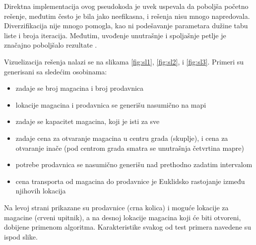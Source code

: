 \documentclass[a4paper]{article}
\begin{document}
Direktna implementacija ovog pseudokoda je uvek uspevala da poboljša početno rešenje, međutim često je bila jako neefikasna, i rešenja nisu mnogo napredovala. Diverzifikacija nije mnogo pomogla, kao ni podešavanje parametara dužine tabu liste i broja iteracija. Međutim, uvođenje unutrašnje i spoljašnje petlje je značajno poboljšalo rezultate \cite{loops}. 

Vizuelizacija rešenja nalazi se na slikama \ref{fig:sl1}, \ref{fig:sl2}, i \ref{fig:sl3}. Primeri su generisani sa sledećim osobinama:
\begin{itemize}
    \item zadaje se broj magacina i broj prodavnica
    \item lokacije magacina i prodavnica se generišu nasumično na mapi
    \item zadaje se kapacitet magacina, koji je isti za sve
    \item zadaje cena za otvaranje magacina u centru grada (skuplje), i cena za otvaranje inače (pod centrom grada smatra se unutrašnja četvrtina mapre)
    \item potrebe prodavnica se nasumično generišu nad prethodno zadatim intervalom
    \item cena transporta od magacina do prodavnice je Euklidsko rastojanje između njihovih lokacija
\end{itemize}

Na levoj strani prikazane su prodavnice (crna kolica) i moguće lokacije za magacine (crveni upitnik), a na desnoj lokacije magacina koji će biti otvoreni, dobijene primenom algoritma. Karakteristike svakog od test primera navedene su ispod slike.
\end{document}
